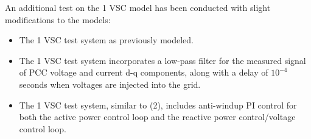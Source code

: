 \documentclass{report}
\begin{document}
An additional test on the 1 VSC model has been conducted with slight modifications to the models:


\begin{itemize}
    \item The 1 VSC test system as previously modeled.
    \item The 1 VSC test system incorporates a low-pass filter for the measured signal of PCC voltage and current d-q components, along with a delay of $10^{-4}$ seconds when voltages are injected into the grid.
    \item The 1 VSC test system, similar to (2), includes anti-windup PI control for both the active power control loop and the reactive power control/voltage control loop.
\end{itemize}

\begin{figure}[htbp]
  \centering
  \\
\end{figure}
\end{document}
